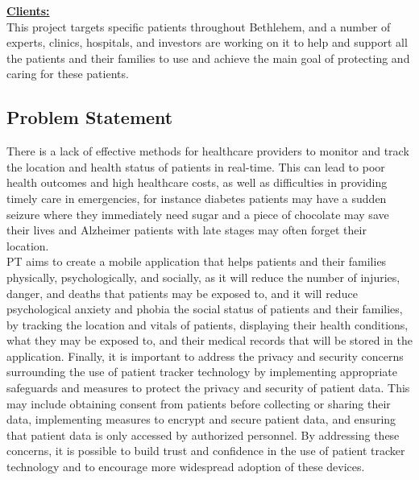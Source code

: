 \documentclass[12pt]{article}
\begin{document}
			\textbf{\underline{Clients:}}\\
			
			This project targets specific patients throughout Bethlehem, and a number of experts, clinics, hospitals, and investors are working on it to help and support all the patients and their families to use and achieve the main goal of protecting and caring for these patients. 

		\subsection{Problem Statement}
			
			\quad There is a lack of effective methods for healthcare providers to monitor and track the location and health status of patients in real-time. This can lead to poor health outcomes and high healthcare costs, as well as difficulties in providing timely care in emergencies, for instance diabetes patients may have a sudden seizure where they immediately need sugar and a piece of chocolate may save their lives and Alzheimer patients with late stages may often forget their location.\\
			
			PT aims to create a mobile application that helps patients and their families physically, psychologically, and socially, as it will reduce the number of injuries, danger, and deaths that patients may be exposed to, and it will reduce psychological anxiety and phobia the social status of patients and their families, by tracking the location and vitals of patients, displaying their health conditions, what they may be exposed to, and their medical records that will be stored in the application. Finally, it is important to address the privacy and security concerns surrounding the use of patient tracker technology by implementing appropriate safeguards and measures to protect the privacy and security of patient data. This may include obtaining consent from patients before collecting or sharing their data, implementing measures to encrypt and secure patient data, and ensuring that patient data is only accessed by authorized personnel. By addressing these concerns, it is possible to build trust and confidence in the use of patient tracker technology and to encourage more widespread adoption of these devices.
			
\end{document}

